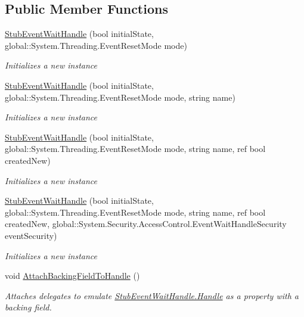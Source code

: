 \subsection*{Public Member Functions}
\begin{DoxyCompactItemize}
\item 
\hyperlink{class_system_1_1_threading_1_1_fakes_1_1_stub_event_wait_handle_a26d4d4ebae99845d955c8fa5effc9eb6}{Stub\-Event\-Wait\-Handle} (bool initial\-State, global\-::\-System.\-Threading.\-Event\-Reset\-Mode mode)
\begin{DoxyCompactList}\small\item\em Initializes a new instance\end{DoxyCompactList}\item 
\hyperlink{class_system_1_1_threading_1_1_fakes_1_1_stub_event_wait_handle_a637ef0f5acef0df643b6506e58e323f8}{Stub\-Event\-Wait\-Handle} (bool initial\-State, global\-::\-System.\-Threading.\-Event\-Reset\-Mode mode, string name)
\begin{DoxyCompactList}\small\item\em Initializes a new instance\end{DoxyCompactList}\item 
\hyperlink{class_system_1_1_threading_1_1_fakes_1_1_stub_event_wait_handle_a9c688ad5cd257452f95bc7e9b9112a3e}{Stub\-Event\-Wait\-Handle} (bool initial\-State, global\-::\-System.\-Threading.\-Event\-Reset\-Mode mode, string name, ref bool created\-New)
\begin{DoxyCompactList}\small\item\em Initializes a new instance\end{DoxyCompactList}\item 
\hyperlink{class_system_1_1_threading_1_1_fakes_1_1_stub_event_wait_handle_ae29de63195d19aacfa8205f2d3e42dbb}{Stub\-Event\-Wait\-Handle} (bool initial\-State, global\-::\-System.\-Threading.\-Event\-Reset\-Mode mode, string name, ref bool created\-New, global\-::\-System.\-Security.\-Access\-Control.\-Event\-Wait\-Handle\-Security event\-Security)
\begin{DoxyCompactList}\small\item\em Initializes a new instance\end{DoxyCompactList}\item 
void \hyperlink{class_system_1_1_threading_1_1_fakes_1_1_stub_event_wait_handle_a6a3981dd3b17fb4d6bd23fa6d0720e30}{Attach\-Backing\-Field\-To\-Handle} ()
\begin{DoxyCompactList}\small\item\em Attaches delegates to emulate \hyperlink{class_system_1_1_threading_1_1_fakes_1_1_stub_event_wait_handle_a6da0ecf5ec64e5461b117bced2054de5}{Stub\-Event\-Wait\-Handle.\-Handle} as a property with a backing field.\end{DoxyCompactList}\item 

\end{DoxyCompactItemize}
